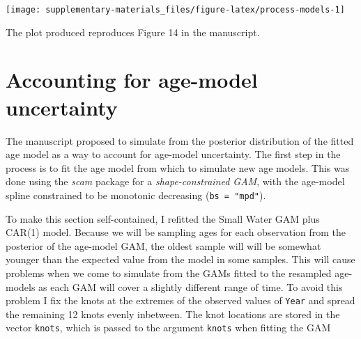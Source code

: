 \documentclass[12pt,]{article}
\newenvironment{Shaded}{\begin{snugshade}}{\end{snugshade}}
\newcommand{\KeywordTok}[1]{\textcolor[rgb]{0.13,0.29,0.53}{\textbf{{#1}}}}
\newcommand{\DataTypeTok}[1]{\textcolor[rgb]{0.13,0.29,0.53}{{#1}}}
\newcommand{\StringTok}[1]{\textcolor[rgb]{0.31,0.60,0.02}{{#1}}}
\newcommand{\NormalTok}[1]{{#1}}
\begin{document}
\begin{Shaded}
\end{Shaded}

\begin{center}\texttt{[image: supplementary-materials\_files/figure-latex/process-models-1]} \end{center}

The plot produced reproduces Figure 14 in the manuscript.

\section{Accounting for age-model
uncertainty}\label{accounting-for-age-model-uncertainty}

The manuscript proposed to simulate from the posterior distribution of
the fitted age model as a way to account for age-model uncertainty. The
first step in the process is to fit the age model from which to simulate
new age models. This was done using the \emph{scam} package for a
\emph{shape-constrained GAM}, with the age-model spline constrained to
be monotonic decreasing (\texttt{bs\ =\ "mpd"}).

To make this section self-contained, I refitted the Small Water GAM plus
CAR(1) model. Because we will be sampling ages for each observation from
the posterior of the age-model GAM, the oldest sample will will be
somewhat younger than the expected value from the model in some samples.
This will cause problems when we come to simulate from the GAMs fitted
to the resampled age-models as each GAM will cover a slightly different
range of time. To avoid this problem I fix the knots at the extremes of
the observed values of \texttt{Year} and spread the remaining 12 knots
evenly inbetween. The knot locations are stored in the vector
\texttt{knots}, which is passed to the argument \texttt{knots} when
fitting the GAM
\end{document}
